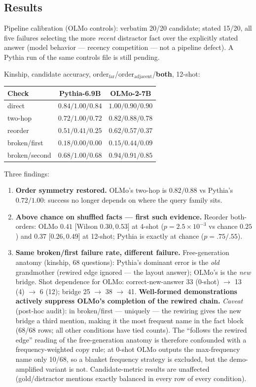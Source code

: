 \documentclass[11pt,a4paper]{article}
\begin{document}
\subsection{Results}
Pipeline calibration (OLMo controls): verbatim 20/20 candidate; stated 15/20, all five failures selecting the more \emph{recent} distractor fact over the explicitly stated answer (model behavior --- recency competition --- not a pipeline defect). A Pythia run of the same controls file is still pending.

Kinship, candidate accuracy, order$_{\mathrm{far}}$/order$_{\mathrm{adjacent}}$/\textbf{both}, 12-shot:
\begin{center}\small
\begin{tabular}{lcc}
\toprule
Check & Pythia-6.9B & OLMo-2-7B\\\midrule
direct & $0.84/1.00/\mathbf{0.84}$ & $1.00/0.90/\mathbf{0.90}$\\
two-hop & $0.72/1.00/\mathbf{0.72}$ & $0.82/0.88/\mathbf{0.78}$\\
reorder & $0.51/0.41/\mathbf{0.25}$ & $0.62/0.57/\mathbf{0.37}$\\
broken/first & $0.18/0.00/\mathbf{0.00}$ & $0.15/0.44/\mathbf{0.09}$\\
broken/second & $0.68/1.00/\mathbf{0.68}$ & $0.94/0.91/\mathbf{0.85}$\\
\bottomrule
\end{tabular}
\end{center}
Three findings:
\begin{enumerate}
\item \textbf{Order symmetry restored.} OLMo's two-hop is $0.82/0.88$ vs Pythia's $0.72/1.00$: success no longer depends on where the query family sits.
\item \textbf{Above chance on shuffled facts --- first such evidence.} Reorder both-orders: OLMo $0.41$ [Wilson $0.30,0.53$] at 4-shot ($p=2.5\times10^{-3}$ vs chance $0.25$) and $0.37$ [$0.26,0.49$] at 12-shot; Pythia is exactly at chance ($p=.75/.55$).
\item \textbf{Same broken/first failure rate, different failure.} Free-generation anatomy (kinship, 68 questions): Pythia's dominant error is the \emph{old} grandmother (rewired edge ignored --- the layout answer); OLMo's is the \emph{new} bridge. Shot dependence for OLMo: correct-new-answer 33 (0-shot) $\to$ 13 (4) $\to$ 6 (12); bridge 25 $\to$ 38 $\to$ 41. \textbf{Well-formed demonstrations actively suppress OLMo's completion of the rewired chain.} \emph{Caveat} (post-hoc audit): in broken/first --- uniquely --- the rewiring gives the new bridge a third mention, making it the most frequent name in the fact block (68/68 rows; all other conditions have tied counts). The ``follows the rewired edge'' reading of the free-generation anatomy is therefore confounded with a frequency-weighted copy rule; at 0-shot OLMo outputs the max-frequency name only 10/68, so a blanket frequency strategy is excluded, but the demo-amplified variant is not. Candidate-metric results are unaffected (gold/distractor mentions exactly balanced in every row of every condition).
\end{enumerate}
\end{document}
